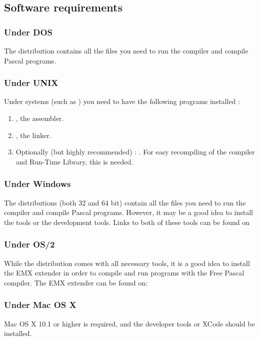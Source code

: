 \subsection{Software requirements}

\subsubsection{Under DOS}
The \dos distribution contains all the files you need to run the compiler
and compile Pascal programs.

\subsubsection{Under UNIX}
Under \unix systems (such as \linux) you need to have the following programs 
installed :
\begin{enumerate}
\item \gnu {}, the \gnu assembler.
\item \gnu {}, the \gnu linker.
\item Optionally (but highly recommended) : \gnu {}. For easy
recompiling of the compiler and Run-Time Library, this is needed.
\end{enumerate}

\subsubsection{Under Windows}
The \windows distributions (both 32 and 64 bit) contain all the files you need to run the compiler
and compile Pascal programs. However, it may be a good idea to install
the  tools or the  development tools. Links
to both of these tools can be found on 

\subsubsection{Under OS/2}
While the \fpc distribution comes with all necessary tools, it is a good
idea to install the EMX extender in order to compile and run
programs with the Free Pascal compiler. The EMX extender can be found on:\\

\subsubsection{Under Mac OS X}
Mac OS X 10.1 or higher is required, and the developer tools or XCode 
should be installed.

